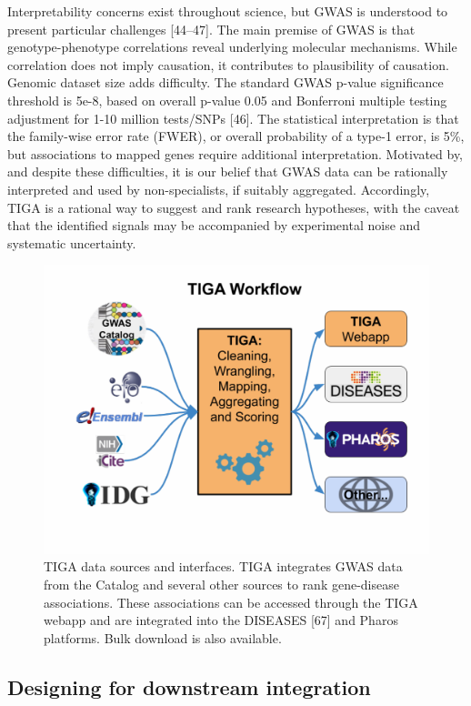 Interpretability concerns exist throughout science, but GWAS is understood to present particular challenges [44–47]. The main premise of GWAS is that genotype-phenotype correlations reveal underlying molecular mechanisms. While correlation does not imply causation, it contributes to plausibility of causation.  Genomic dataset size adds difficulty.  The standard GWAS p-value significance threshold is 5e-8, based on overall p-value 0.05 and Bonferroni multiple testing adjustment for 1-10 million tests/SNPs [46]. The statistical interpretation is that the family-wise error rate (FWER), or overall probability of a type-1 error, is 5\%, but associations to mapped genes require additional interpretation. Motivated by, and despite these difficulties, it is our belief that GWAS data can be rationally interpreted and used by non-specialists, if suitably aggregated. Accordingly, TIGA is a rational way to suggest and rank research hypotheses, with the caveat that the identified signals may be accompanied by experimental noise and systematic uncertainty.

\begin{figure}
	\includegraphics[width=\textwidth]{figures/tiga/FIG09_TIGA_Workflow.jpg}
	\caption{TIGA data sources and interfaces. TIGA integrates GWAS data from the Catalog and several other sources to rank gene-disease associations. These associations can be accessed through the TIGA webapp and are integrated into the DISEASES [67] and Pharos platforms. Bulk download is also available.}
	\label{fig:TIGA_09}
\end{figure}

\subsection{Designing for downstream integration}


